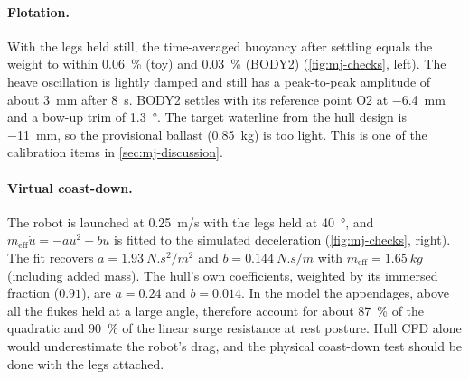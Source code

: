 \paragraph{Flotation.}
With the legs held still, the time-averaged buoyancy after settling equals the weight
to within \SI{0.06}{\percent} (toy) and \SI{0.03}{\percent} (BODY2)
(\cref{fig:mj-checks}, left). The heave oscillation is lightly damped and still has a
peak-to-peak amplitude of about \SI{3}{mm} after \SI{8}{s}. BODY2 settles with its
reference point O2 at \SI{-6.4}{mm} and a bow-up trim of \SI{1.3}{\degree}. The target
waterline from the hull design is \SI{-11}{mm}, so the provisional ballast
(\SI{0.85}{kg}) is too light. This is one of the calibration items in
\cref{sec:mj-discussion}.

\paragraph{Virtual coast-down.}
The robot is launched at \SI{0.25}{m/s} with the legs held at \SI{40}{\degree}, and
$m_{\text{eff}}\dot u=-a u^2-b u$ is fitted to the simulated deceleration
(\cref{fig:mj-checks}, right). The fit recovers $a=\SI{1.93}{N.s^2/m^2}$ and
$b=\SI{0.144}{N.s/m}$ with $m_{\text{eff}}=\SI{1.65}{kg}$ (including added mass). The
hull's own coefficients, weighted by its immersed fraction ($0.91$), are $a=0.24$ and
$b=0.014$. In the model the appendages, above all the flukes held at a large angle,
therefore account for about \SI{87}{\percent} of the quadratic and \SI{90}{\percent} of the
linear surge resistance at rest posture. Hull CFD alone would
underestimate the robot's drag, and the physical coast-down test should be done with
the legs attached.

